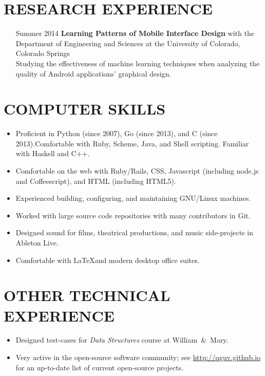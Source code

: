 \documentclass{res}     %
\begin{document}
\begin{resume}
\section{RESEARCH EXPERIENCE}
\vspace{5mm}
\begin{itemize}[font=\itshape,align=parleft,labelwidth=3cm,leftmargin=2cm]
    \item[Summer 2014]
        \textbf{Learning Patterns of Mobile Interface Design}
        with the Department of Engineering and Sciences
        at the University of Colorado, Colorado Springs
        \vspace{1mm} \\
        Studying the effectiveness of machine learning techniques when analyzing the quality of Android applications' graphical design.
\end{itemize}

\section{COMPUTER SKILLS}
\vspace{5mm}
\begin{itemize}[leftmargin=5mm]
\item Proficient in Python (since 2007), Go (since 2013), and C (since 2013).Comfortable with Ruby, Scheme, Java, and Shell scripting. Familiar with Haskell and C++.
\item Comfortable on the web with Ruby/Rails, CSS, Javascript (including node.js and Coffeescript), and HTML (including HTML5).
\item Experienced building, configuring, and maintaining GNU/Linux machines.
\item Worked with large source code repositories with many contributors in Git.
\item Designed sound for films, theatrical productions, and music side-projects in Ableton Live.
\item Comfortable with \LaTeX and modern desktop office suites.
\end{itemize}
 
\section{OTHER TECHNICAL EXPERIENCE}
\vspace{5mm}
\begin{itemize}[leftmargin=5mm]
\item Designed test-cases for \emph{Data Structures} course at William~\&~Mary.
\item Very active in the open-source software community; see \url{http://qguv.github.io} for an up-to-date list of current open-source projects.
\end{itemize}


\end{resume}
\end{document}
